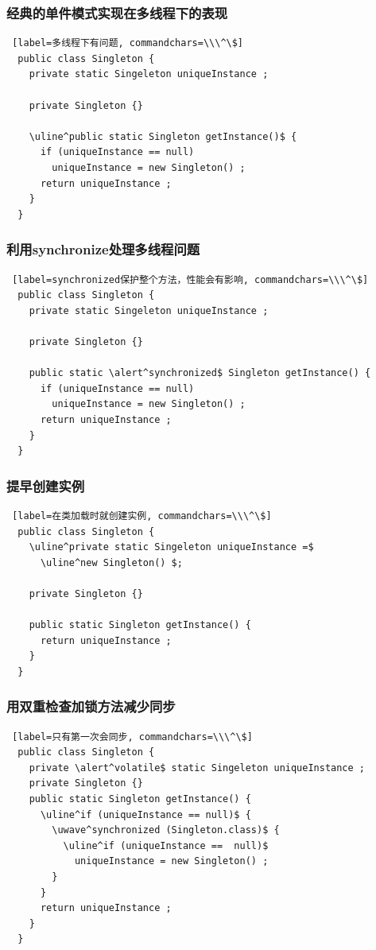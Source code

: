 \documentclass[compress]{beamer}
\begin{document}
\begin{frame}[fragile]
  \frametitle{经典的单件模式实现在多线程下的表现}
\begin{Verbatim} [label=多线程下有问题, commandchars=\\\^\$]
  public class Singleton {
    private static Singeleton uniqueInstance ;

    private Singleton {} 

    \uline^public static Singleton getInstance()$ {
      if (uniqueInstance == null) 
        uniqueInstance = new Singleton() ;
      return uniqueInstance ;
    }
  }
\end{Verbatim}
\end{frame}

\begin{frame}[fragile]
  \frametitle{利用synchronize处理多线程问题}
\begin{Verbatim} [label=synchronized保护整个方法，性能会有影响, commandchars=\\\^\$]
  public class Singleton {
    private static Singeleton uniqueInstance ;

    private Singleton {} 

    public static \alert^synchronized$ Singleton getInstance() {
      if (uniqueInstance == null) 
        uniqueInstance = new Singleton() ;
      return uniqueInstance ;
    }
  }
\end{Verbatim}
\end{frame}


\begin{frame}[fragile]
  \frametitle{提早创建实例}
\begin{Verbatim} [label=在类加载时就创建实例, commandchars=\\\^\$]
  public class Singleton {
    \uline^private static Singeleton uniqueInstance =$ 
      \uline^new Singleton() $;

    private Singleton {} 

    public static Singleton getInstance() {
      return uniqueInstance ;
    }
  }
\end{Verbatim}
\end{frame}

\begin{frame}[fragile]
  \frametitle{用双重检查加锁方法减少同步}
\begin{Verbatim} [label=只有第一次会同步, commandchars=\\\^\$]
  public class Singleton {
    private \alert^volatile$ static Singeleton uniqueInstance ;
    private Singleton {} 
    public static Singleton getInstance() {
      \uline^if (uniqueInstance == null)$ {
        \uwave^synchronized (Singleton.class)$ {
          \uline^if (uniqueInstance ==  null)$ 
            uniqueInstance = new Singleton() ;
        }
      }
      return uniqueInstance ;
    }
  }
\end{Verbatim}

\end{frame}
\end{document}
